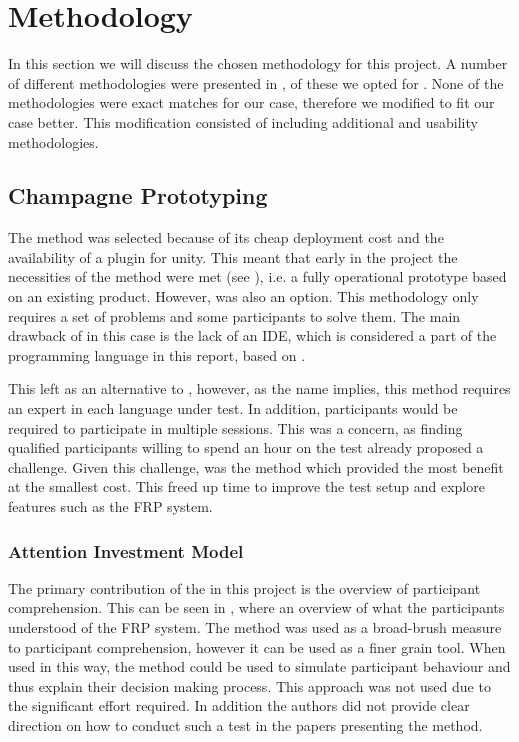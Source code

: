 \section{Methodology}
In this section we will discuss the chosen methodology for this project. A number of different methodologies were presented in , of these we opted for \champagne. None of the methodologies were exact matches for our case, therefore we modified \champagne to fit our case better. This modification consisted of including additional \attentions and \cognitive usability methodologies.

\subsection{Champagne Prototyping}
The \champagne method was selected because of its cheap deployment cost and the availability of a \fs plugin for unity\cite{fsharp2019plugin}. This meant that early in the project the necessities of the method were met (see ), i.e. a fully operational prototype based on an existing product. However, \discount was also an option. This methodology only requires a set of problems and some participants to solve them. The main drawback of \discount in this case is the lack of an \gls{IDE}, which is considered a part of the programming language in this report, based on \cognitive.

This left \expert as an alternative to \champagne, however, as the name implies, this method requires an expert in each language under test. In addition, participants would be required to participate in multiple sessions. This was a concern, as finding qualified participants willing to spend an hour on the test already proposed a challenge. Given this challenge, \champagne was the method which provided the most benefit at the smallest cost. This freed up time to improve the test setup and explore features such as the \gls{FRP} system.

\subsubsection{Attention Investment Model}
The primary contribution of the \attention in this project is the overview of participant comprehension. This can be seen in , where an overview of what the participants understood of the \gls{FRP} system. The method was used as a broad-brush measure to participant comprehension, however it can be used as a finer grain tool. When used in this way, the method could be used to simulate participant behaviour and thus explain their decision making process\cite{blackwell2002first}. This approach was not used due to the significant effort required. In addition the authors did not provide clear direction on how to conduct such a test in the papers presenting the method.

